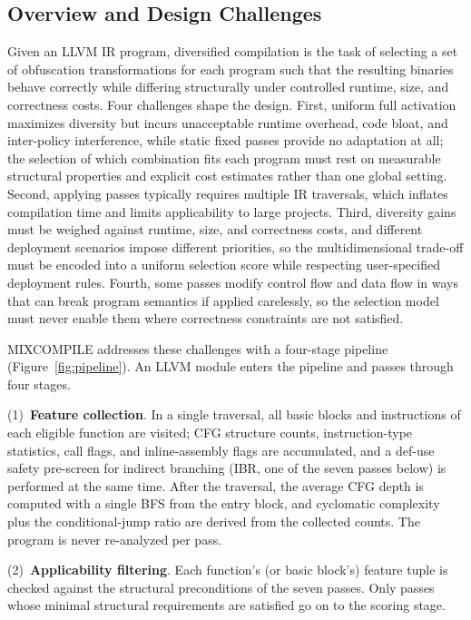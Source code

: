 \documentclass[5p,times,authoryear]{elsarticle}
\theoremstyle{plain}
\theoremstyle{definition}
\theoremstyle{remark}
\begin{document}
\subsection{Overview and Design Challenges}
\label{sec:overview}

Given an LLVM IR program, diversified compilation is the task of selecting a set of
obfuscation transformations for each program such that the resulting binaries behave
correctly while differing structurally under controlled runtime, size, and correctness
costs. Four challenges shape the design. First, uniform full activation maximizes
diversity but incurs unacceptable runtime overhead, code bloat, and inter-policy
interference, while static fixed passes provide no adaptation at all; the selection of
which combination fits each program must rest on measurable structural properties and
explicit cost estimates rather than one global setting. Second, applying passes
typically requires multiple IR traversals, which inflates compilation time and limits
applicability to large projects. Third, diversity gains must be weighed against
runtime, size, and correctness costs, and different deployment scenarios impose
different priorities, so the multidimensional trade-off must be encoded into a uniform
selection score while respecting user-specified deployment rules. Fourth, some passes
modify control flow and data flow in ways that can break program semantics if applied
carelessly, so the selection model must never enable them where correctness
constraints are not satisfied.

MIXCOMPILE addresses these challenges with a four-stage pipeline
(Figure~\ref{fig:pipeline}). An LLVM module enters the pipeline and passes
through four stages.

(1)~\textbf{Feature collection}. In a single traversal, all basic blocks
and instructions of each eligible function are visited; CFG structure counts,
instruction-type statistics, call flags, and inline-assembly flags are accumulated, and
a def-use safety pre-screen for indirect branching (IBR, one of the seven passes
below) is performed at the same time. After the traversal,
the average CFG depth is computed with a single BFS from the entry block, and
cyclomatic complexity plus the conditional-jump ratio are derived from the collected
counts. The program is never re-analyzed per pass.

(2)~\textbf{Applicability filtering}. Each function's (or basic block's)
feature tuple is checked against the structural preconditions of the seven passes.
Only passes whose minimal structural requirements are satisfied go on to the scoring
stage.
\end{document}
